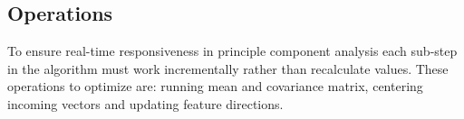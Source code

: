 \subsection{Operations}
To ensure real-time responsiveness in principle component analysis each sub-step in the algorithm must work incrementally rather than recalculate values.
These operations to optimize are: running mean and covariance matrix, centering incoming vectors and updating feature directions.




